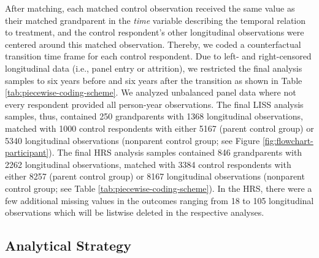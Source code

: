 \documentclass[
  english,
  man, noextraspace]{apa7}
\begin{document}
After matching, each matched control observation received the same value as their matched grandparent in the \emph{time} variable describing the temporal relation to treatment, and the control respondent's other longitudinal observations were centered around this matched observation. Thereby, we coded a counterfactual transition time frame for each control respondent. Due to left- and right-censored longitudinal data (i.e., panel entry or attrition), we restricted the final analysis samples to six years before and six years after the transition as shown in Table \ref{tab:piecewise-coding-scheme}. We analyzed unbalanced panel data where not every respondent provided all person-year observations. The final LISS analysis samples, thus, contained 250 grandparents with 1368 longitudinal observations, matched with 1000 control respondents with either 5167 (parent control group) or 5340 longitudinal observations (nonparent control group; see Figure \ref{fig:flowchart-participant}). The final HRS analysis samples contained 846 grandparents with 2262 longitudinal observations, matched with 3384 control respondents with either 8257 (parent control group) or 8167 longitudinal observations (nonparent control group; see Table \ref{tab:piecewise-coding-scheme}). In the HRS, there were a few additional missing values in the outcomes ranging from 18 to 105 longitudinal observations which will be listwise deleted in the respective analyses.

\hypertarget{analytical-strategy}{%
\subsection{Analytical Strategy}\label{analytical-strategy}}
\end{document}

